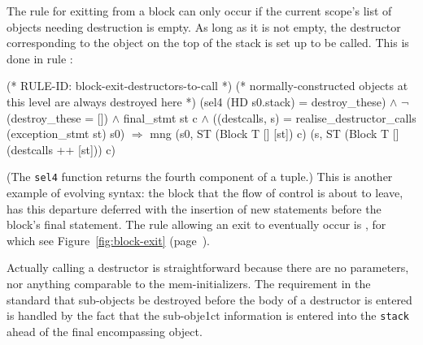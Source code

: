\documentclass[11pt]{article}
\begin{document}
The rule for exitting from a block can only occur if the current
scope's list of objects needing destruction is empty.  As long as it
is not empty, the destructor corresponding to the object on the top of
the stack is set up to be called.  This is done in rule
:
\begin{stdrule}
(* RULE-ID: block-exit-destructors-to-call *)
(* normally-constructed objects at this level are always
   destroyed here *)
     (sel4 (HD s0.stack) = destroy_these) \(\land\)
     \(\neg\)(destroy_these = []) \(\land\)
     final_stmt st c \(\land\)
     ((destcalls, s) =
        realise_destructor_calls (exception_stmt st) s0)
   \(\Rightarrow\)
     mng (s0, ST (Block T [] [st]) c)
         (s, ST (Block T [] (destcalls ++ [st])) c)
\end{stdrule}
(The \texttt{sel4} function%
 returns the fourth
component of a tuple.) This is another example of evolving syntax: the
block that the flow of control is about to leave, has this departure
deferred with the insertion of new statements before the block's final
statement.  The rule allowing an exit to eventually occur is
, for which see Figure~\ref{fig:block-exit}
(page~\pageref{fig:block-exit}).

Actually calling a destructor is straightforward because there are no
parameters, nor anything comparable to the mem-initializers.  The
requirement in the standard that sub-objects be destroyed before the
body of a destructor is entered is handled by the fact that the
sub-obje1ct information is entered into the \texttt{stack} ahead of the
final encompassing object.
\end{document}
